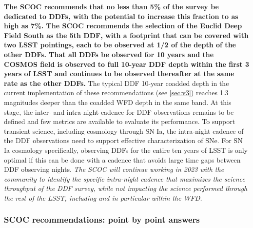  
{\bf The SCOC recommends that no less than 5\% of the survey be dedicated to DDFs, with the potential to increase this fraction to as high as 7\%. The SCOC recommends the selection of the Euclid Deep Field South as the 5th DDF, with a footprint that can be covered with two LSST pointings, each to be observed at 1/2 of the depth of the other DDFs. That all DDFs be observed for 10 years and the COSMOS field is observed to full 10-year DDF depth within the first 3 years of LSST and continues to be observed thereafter at the same rate as the other DDFs.} The typical DDF 10-year coadded depth in the current implementation of these recommendations (see \autoref{sec:v3}) reaches 1.3 magnitudes deeper than the coadded WFD depth in the same band. At this stage, the inter- and intra-night cadence for DDF observations remains to be defined and few metrics are available to evaluate its performance. %
To support transient science, including cosmology through SN Ia, the intra-night cadence of the DDF observations need to support effective characterization of SNe. For SN Ia cosmology specifically, observing DDFs for the entire ten years of LSST is only optimal  if this can be done with a cadence that avoids large time gaps between DDF observing nights. \emph{The SCOC will continue working in 2023 with the community to identify the specific intra-night cadence that maximizes the science throughput of the DDF survey, while not impacting the science performed through the rest of the LSST, including and in particular within the WFD.}
 
 \subsubsection{SCOC recommendations: point by point answers}\label{sec:ddf_points}
 
